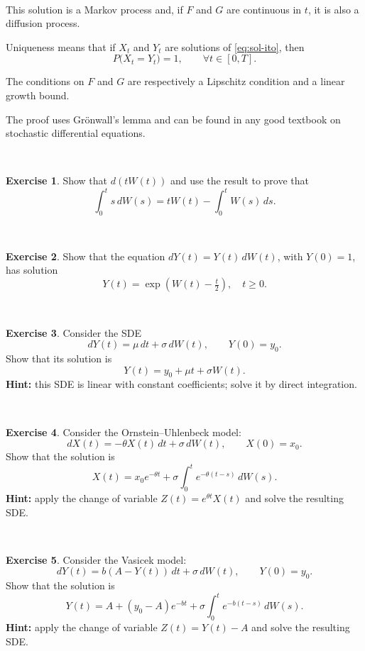 \documentclass[
  11pt,
  a4paper,
]{book}
\theoremstyle{definition}
\theoremstyle{definition}
\theoremstyle{definition}
\newtheorem{exercise}{Exercise}[chapter]
\theoremstyle{definition}
\theoremstyle{remark}
\begin{document}
\(\,\)

This solution is a Markov process and, if \(F\) and \(G\) are continuous in \(t\), it is also a diffusion process.

Uniqueness means that if \(X_t\) and \(Y_t\) are solutions of \eqref{eq:sol-ito}, then
\[
P\big(X_t = Y_t\big) = 1,\qquad \forall t\in[0,T].
\]

The conditions on \(F\) and \(G\) are respectively a Lipschitz condition and a linear growth bound.

The proof uses Grönwall's lemma and can be found in any good textbook on stochastic differential equations.

\(\,\)

\begin{exercise}
Show that \(d(tW(t))\) and use the result to prove that
\[
\int_0^t s \, dW(s) = tW(t) - \int_0^t W(s)\, ds.
\]
\end{exercise}

\(\,\)

\begin{exercise}
Show that the equation \(dY(t) = Y(t)\, dW(t)\), with \(Y(0)=1\), has solution
\[
Y(t) = \exp\!\left(W(t) - \tfrac{t}{2}\right), \quad t \ge 0.
\]
\end{exercise}

\(\,\)

\begin{exercise}
Consider the SDE
\[
dY(t) = \mu\,dt + \sigma\,dW(t), \qquad Y(0) = y_0.
\]
Show that its solution is
\[
Y(t) = y_0 + \mu t + \sigma W(t).
\]
\textbf{Hint:} this SDE is linear with constant coefficients; solve it by direct integration.
\end{exercise}

\(\,\)

\begin{exercise}
Consider the Ornstein--Uhlenbeck model:
\[
dX(t) = -\theta X(t)\,dt + \sigma\,dW(t), \qquad X(0)=x_0.
\]
Show that the solution is
\[
X(t) = x_0 e^{-\theta t} + \sigma \int_0^t e^{-\theta (t-s)}\,dW(s).
\]
\textbf{Hint:} apply the change of variable \(Z(t) = e^{\theta t} X(t)\) and solve the resulting SDE.
\end{exercise}

\(\,\)

\begin{exercise}
Consider the Vasicek model:
\[
dY(t) = b(A - Y(t))\,dt + \sigma\,dW(t), \qquad Y(0)=y_0.
\]
Show that the solution is
\[
Y(t) = A + (y_0 - A)e^{-bt} + \sigma \int_0^t e^{-b(t-s)}\,dW(s).
\]
\textbf{Hint:} apply the change of variable \(Z(t) = Y(t) - A\) and solve the resulting SDE.
\end{exercise}
\end{document}
